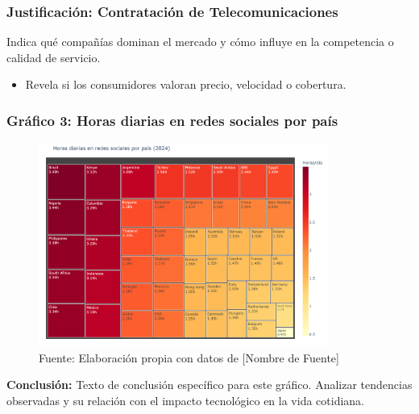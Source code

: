 \documentclass[12pt, a4paper]{article}
\begin{document}
\subsubsection*{Justificación: Contratación de Telecomunicaciones}
Indica qué compañías dominan el mercado y cómo influye en la competencia o calidad de servicio.

\begin{itemize}
    \item Revela si los consumidores valoran precio, velocidad o cobertura.
\end{itemize}

\subsubsection*{Gráfico 3: Horas diarias en redes sociales por país}
\begin{figure}[H]
    \centering
    \includegraphics[width=0.85\textwidth]{images/graph1_JG.png}
    \caption{Fuente: Elaboración propia con datos de [Nombre de Fuente]}
\end{figure}

\textbf{Conclusión:}  
Texto de conclusión específico para este gráfico. Analizar tendencias observadas y su relación con el impacto tecnológico en la vida cotidiana.
\end{document}
